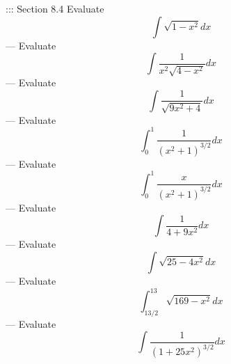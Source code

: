 ::: Section 8.4
Evaluate
\[\int\sqrt{1-x^2}dx\]
---
Evaluate
\[\int\frac{1}{x^2\sqrt{4-x^2}}dx\]
---
Evaluate
\[\int\frac{1}{\sqrt{9x^2+4}}dx\]
---
Evaluate
\[\int_0^1\frac{1}{(x^2+1)^{3/2}}dx\]
---
Evaluate
\[\int_0^1\frac{x}{(x^2+1)^{3/2}}dx\]
---
Evaluate
\[\int\frac{1}{4+9x^2}dx\]
---
Evaluate
\[\int\sqrt{25-4x^2}dx\]
---
Evaluate
\[\int_{13/2}^{13}\sqrt{169-x^2}dx\]
---
Evaluate
\[\int\frac{1}{(1+25x^2)^{3/2}}dx\]

